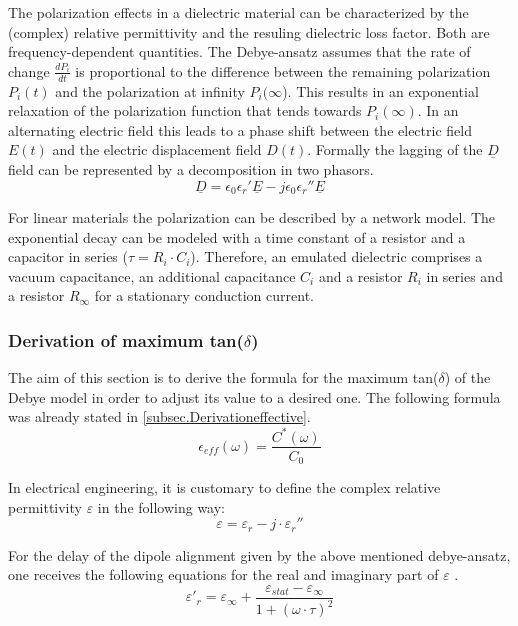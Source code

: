 The polarization effects in a dielectric material can be characterized by the (complex) relative permittivity and the resuling dielectric loss factor.
Both are frequency-dependent quantities.
The Debye-ansatz assumes that the rate of change $ \frac{dP_i}{dt}$ is proportional to the difference between the remaining polarization $P_i(t)$  and the polarization at infinity $P_i(\infty$). This results in an exponential relaxation of the polarization function that tends towards $P_i(\infty)$.
In an alternating electric field this leads to a phase shift between the electric field $E(t)$ and the 
electric displacement field $D(t)$.
\newline
Formally the lagging of the $\underline{D}$ field can be represented by a decomposition in two phasors.
\begin{equation}
 \underline{D}=\epsilon_{0}\epsilon_{r}'\underline{E}-j\epsilon_{0}\epsilon_{r}''\underline{E}
\end{equation}



For linear materials the polarization can be described by a network model. The exponential decay can be modeled with a time constant of a resistor and a capacitor in series ($\tau=R_i \cdot C_i$). Therefore, an emulated dielectric comprises a vacuum capacitance, an additional capacitance $C_i$ and a resistor $R_i$ in series and a resistor $R_{\infty}$ for a stationary conduction current. 

\subsubsection{Derivation of maximum tan($\delta$)}
The aim of this section is to derive the formula for the maximum tan($\delta$) of the Debye model in order to adjust its value to a desired one. The following formula was already stated in \ref{subsec.Derivationeffective}.
\begin{equation}
\epsilon_{eff} (\omega) = \frac{C^*(\omega)}{C_0}
\end{equation}

In electrical engineering, it is customary to define the  complex relative permittivity $\varepsilon$ in the following way: 
\begin{equation}
\varepsilon  = \varepsilon_r-j \cdot \varepsilon_r''
\end{equation}

For the delay of the dipole alignment given by the above mentioned debye-ansatz, one receives the following equations for the real and imaginary part of $\varepsilon$ \cite{Kuchler}. 
\begin{equation}
\varepsilon'_r = \varepsilon_{\infty} + \frac{\varepsilon_{stat}-\varepsilon_{\infty}}{1+(\omega \cdot \tau )^2}
\end{equation}

